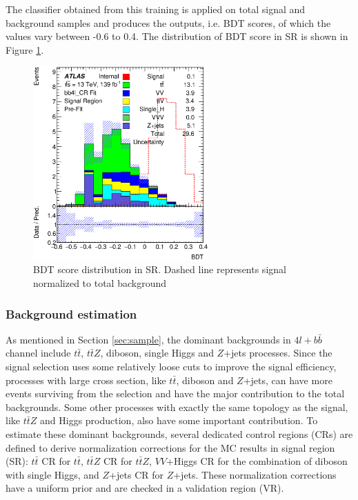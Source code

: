 The classifier obtained from this training is applied on total signal and background samples and produces the outputs, i.e. BDT scores, of which the values vary between -0.6 to 0.4. The distribution of BDT score in SR is shown in Figure \ref{Fig.SR pre-fit}. 

\begin{figure}[h!]
	\caption{BDT score distribution in SR. Dashed line represents signal normalized to total background}
	\label{Fig.SR pre-fit}
	\centering
	\includegraphics[width=0.6\textwidth]{figures/4lbb/Plots/SR.eps}
\end{figure}

\subsubsection{Background estimation}
\label{subsubsec:bkg}

As mentioned in Section \ref{sec:sample}, the dominant backgrounds in $4l+b\bar{b}$ channel include $t\bar{t}$, $t\bar{t}Z$, diboson, single Higgs and $Z$+jets processes. Since the signal selection uses some relatively loose cuts to improve the signal efficiency, processes with large cross section, like $t\bar{t}$, diboson and $Z$+jets, can have more events surviving from the selection and have the major contribution to the total backgrounds. Some other processes with exactly the same topology as the signal, like $t\bar{t}Z$ and Higgs production, also have some important contribution. To estimate these dominant backgrounds, several dedicated control regions (CRs) are defined to derive normalization corrections for the MC results in signal region (SR): $t\bar{t}$ CR for $t\bar{t}$, $t\bar{t}Z$ CR for $t\bar{t}Z$, $VV$+Higgs CR for the combination of diboson with single Higgs, and $Z$+jets CR for $Z$+jets. These normalization corrections have a uniform prior and are checked in a validation region (VR).

